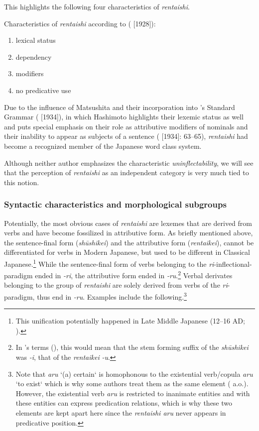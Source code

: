 \documentclass[output=paper,colorlinks,citecolor=brown]{langscibook}
\begin{document}
This highlights the following four characteristics of \emph{rentaishi}.

\begin{exe}
	\ex \label{12ex29} Characteristics of \emph{rentaishi} according to \citeauthor{matsushita1976} (\citeyear{matsushita1976} [1928]):
	\begin{enumerate}
		\item lexical status
		\item dependency
		\item modifiers
		\item no predicative use
	\end{enumerate}
\end{exe}

Due to the influence of Matsushita and their incorporation into \citeauthor{hashimoto1948}'s Standard Grammar (\citeyear{hashimoto1948} [1934]), in which Hashimoto highlights their lexemic status as well and puts special emphasis on their role as attributive modifiers of nominals and their inability to appear as subjects of a sentence (\citealt{hashimoto1948} [1934]: 63--65), \emph{rentaishi} had become a recognized member of the Japanese word class system.

Although neither author emphasizes the characteristic \emph{uninflectability}, we will see that the perception of \emph{rentaishi} as an independent category is very much tied to this notion.

\subsubsection{Syntactic characteristics and morphological subgroups} \label{12sec.3.3.2}

Potentially, the most obvious cases of \emph{rentaishi} are lexemes that are derived from verbs and have become fossilized in attributive form. As briefly mentioned above, the sentence-final form (\emph{shūshikei}) and the attributive form (\emph{rentaikei}), cannot be differentiated for verbs in Modern Japanese, but used to be different in Classical Japanese.\footnote{This unification potentially happened in Late Middle Japanese (12--16 AD; \citealt{lewin2003, frellesvig2010}).} While the sentence-final form of verbs belonging to the \emph{ri}-inflectional-paradigm ended in \emph{-ri}, the attributive form ended in \emph{-ru}.\footnote{In \citeauthor{iwasaki2013}'s terms (\citeyear{iwasaki2013}), this would mean that the stem forming suffix of the \emph{shūshikei} was \emph{-i}, that of the \emph{rentaikei} \emph{-u}.} Verbal derivates belonging to the group of \emph{rentaishi} are solely derived from verbs of the \emph{ri}-paradigm, thus end in \emph{-ru}. Examples include the following.\footnote{Note that \emph{aru} `(a) certain` is homophonous to the existential verb/copula \emph{aru} `to exist` which is why some	authors treat them as the same element (\citealt{lehmannnishina2015} a.o.).  However, the existential verb \emph{aru} is restricted to inanimate entities and with these entities can express predication	relations, which is why these two elements are kept apart here since the \emph{rentaishi aru} never appears in predicative position.}
\end{document}
